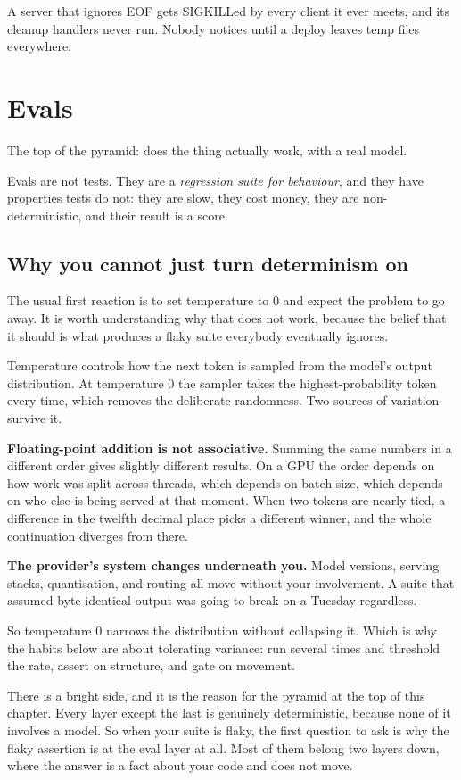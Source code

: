 A server that ignores EOF gets SIGKILLed by every client it ever meets, and its
cleanup handlers never run. Nobody notices until a deploy leaves temp files
everywhere.

\section{Evals}

The top of the pyramid: does the thing actually work, with a real model.

Evals are not tests. They are a \emph{regression suite for behaviour}, and they
have properties tests do not: they are slow, they cost money, they are
non-deterministic, and their result is a score.

\subsection{Why you cannot just turn determinism on}

The usual first reaction is to set temperature to 0 and expect the problem to go
away. It is worth understanding why that does not work, because the belief that
it should is what produces a flaky suite everybody eventually ignores.

Temperature controls how the next token is sampled from the model's output
distribution. At temperature 0 the sampler takes the highest-probability token
every time, which removes the deliberate randomness. Two sources of variation
survive it.

\textbf{Floating-point addition is not associative.} Summing the same numbers in
a different order gives slightly different results. On a GPU the order depends on
how work was split across threads, which depends on batch size, which depends on
who else is being served at that moment. When two tokens are nearly tied, a
difference in the twelfth decimal place picks a different winner, and the whole
continuation diverges from there.

\textbf{The provider's system changes underneath you.} Model versions, serving
stacks, quantisation, and routing all move without your involvement. A suite
that assumed byte-identical output was going to break on a Tuesday regardless.

So temperature 0 narrows the distribution without collapsing it. Which is why
the habits below are about tolerating variance: run several times and threshold
the rate, assert on structure, and gate on movement.

There is a bright side, and it is the reason for the pyramid at the top of this
chapter. Every layer except the last is genuinely deterministic, because none of
it involves a model. So when your suite is flaky, the first question to ask is why the flaky
assertion is at the eval layer at all. Most of them belong two layers down,
where the answer is a fact about your code and does not move.

